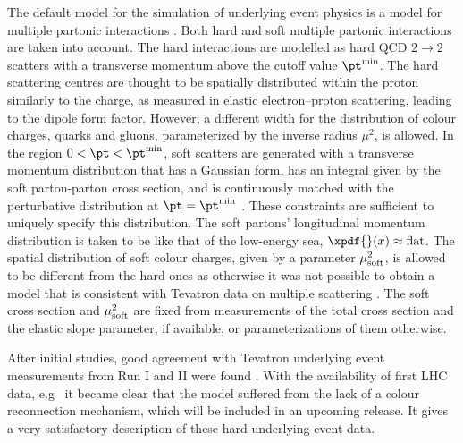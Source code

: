 The default model for the simulation of
underlying
event physics is a model for multiple partonic interactions
\cite{Bahr:2008dy}.  Both hard and soft multiple partonic interactions
are taken into account.  The hard interactions are modelled as hard QCD
$2\to 2$ scatters with a transverse momentum above the cutoff value
$\pt^{\rm min}$.  The hard scattering centres are thought to be
spatially distributed within the proton similarly to the charge,
as measured in elastic electron--proton scattering, leading to the
dipole form factor.  However, a different width for the
distribution of colour charges, quarks and gluons, parameterized by the inverse
radius $\mu^2$, is allowed. 
%
In the region $0<\pt<\pt^{\rm min}$, soft scatters are generated
with a transverse momentum distribution that has a Gaussian form, has an
integral given by the soft parton-parton cross section, and is
continuously matched with the perturbative distribution at $\pt=\pt^{\rm min}$
\cite{Borozan:2002fk}. These constraints are sufficient to uniquely specify
this distribution. The soft partons' longitudinal momentum
distribution is taken to be like that of the low-energy sea,
\ie $\xpdf{}(x) \approx \text{flat}$.
The spatial distribution of soft colour charges, given by a
parameter $\mu_{\rm soft}^2$, is allowed to be different from the hard ones as
otherwise it was not possible to obtain a model that is consistent with Tevatron
data on multiple scattering \cite{Bahr:2008wk}.  The soft cross
section and $\mu_{\rm soft}^2$ are fixed from measurements of the total
cross section and the elastic slope parameter, if available, or
parameterizations of them otherwise.

After initial studies, good agreement with Tevatron underlying event
measurements from Run I and II were found \cite{Bahr:2008dy}.  With
the availability of first LHC data, e.g\ \cite{Aad:2010rd,Atlas:2010xx}
it became clear that the model suffered from the lack of a colour
reconnection mechanism, which will be included in an upcoming release.
It gives a very satisfactory description of these hard underlying event
data.

\mcsubsection{\gensectionhadronize}

